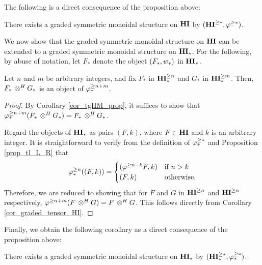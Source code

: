 The following is a direct consequence of the proposition above:

\begin{cor}\label{cor_graded_tensor_HI}
There exists a graded symmetric monoidal structure on $\mathbf{HI}$ by
$(\mathbf{HI}^{\geq *}, \varphi^{\geq *})$.
\end{cor}

We now show that the graded symmetric monoidal structure on $\mathbf{HI}$
can be extended to a graded symmetric monoidal structure on $\mathbf{HI}_*$.
For the following, by abuse of notation, let $F_*$ denote the 
object $(F_*, w_*)$ in $\mathbf{HI}_*$.

\begin{prop}\label{prop_graded_mon_struct_HM}
Let $n$ and $m$ be arbitrary integers, and fix $F_*$ in $\mathbf{HI}_*^{\geq n}$ 
and $G_*$ in $\mathbf{HI}_*^{\geq m}$. Then, $F_* \,\otimes^H G_*$ is an object of 
$\varphi^{\geq n + m}_{*}$.
\end{prop}
\begin{proof}
By Corollary \ref{cor_tgHM_prop}, it suffices to show that $\varphi^{\geq n + m}_{*}(F_*
\,\otimes^H G_*) = F_* \,\otimes^H G_*$.

Regard the objects of $\mathbf{HI}_*$ as pairs $(F, k)$, where $F \in \mathbf{HI}$
and $k$ is an arbitrary integer. It is straightforward to 
verify from the definition of $\varphi^{\geq *}_{*}$ and Proposition \ref{prop_tl_L_R} 
that
\[
\varphi^{\geq n}_{*}((F, k)) = \begin{cases}
(\varphi^{\geq n - k}F, k) &\textrm{if }n > k\\
(F, k)             &\textrm{otherwise}.
\end{cases}
\]
Therefore, we are reduced to showing that for $F$ and $G$ in
$\mathbf{HI}^{\geq n}$ and $\mathbf{HI}^{\geq n}$ respectively, 
$\varphi^{\geq n + m}(F \,\otimes^H G) = F \,\otimes^H G$. This follows directly from 
Corollary \ref{cor_graded_tensor_HI}.
\end{proof}

Finally, we obtain the following corollary as a direct consequence
of the proposition above:

\begin{cor}\label{cor_graded_mon_struct_HM}
There exists a graded symmetric monoidal structure on $\mathbf{HI}_*$ by
$(\mathbf{HI}_*^{\geq *}, \varphi^{\geq *}_{*})$.
\end{cor}
